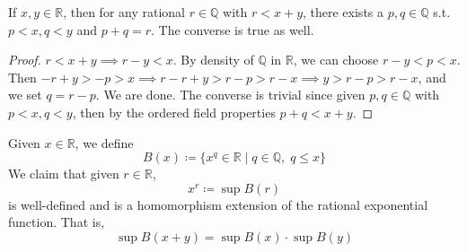   \begin{lemma}
    If $x, y \in \mathbb{R}$, then for any rational $r \in \mathbb{Q}$ with $r < x + y$, there exists a $p, q \in \mathbb{Q}$ s.t. $p < x, q < y$ and $p + q = r$. The converse is true as well. 
  \end{lemma}
  \begin{proof}
    $r < x + y \implies r - y < x$. By density of $\mathbb{Q}$ in $\mathbb{R}$, we can choose $r - y < p < x$. Then $-r + y > -p > x \implies r - r + y > r - p > r - x \implies y > r - p > r - x$, and we set $q = r - p$. We are done. The converse is trivial since given $p, q \in \mathbb{Q}$ with $p < x, q < y$, then by the ordered field properties $p + q < x + y$. 
  \end{proof}

  \begin{corollary}
    Given $x\in \mathbb{R}$, we define 
    \begin{equation}
      B(x) \coloneqq \{ x^q \in \mathbb{R} \mid q \in \mathbb{Q}, \; q \leq x \}
    \end{equation}
    We claim that given $r \in \mathbb{R}$, 
    \begin{equation}
      x^r \coloneqq \sup B(r)
    \end{equation}
    is well-defined and is a homomorphism extension of the rational exponential function. That is, 
    \begin{equation}
      \sup{B(x + y)} = \sup{B(x)} \cdot \sup{B(y)}
    \end{equation}
  \end{corollary}
